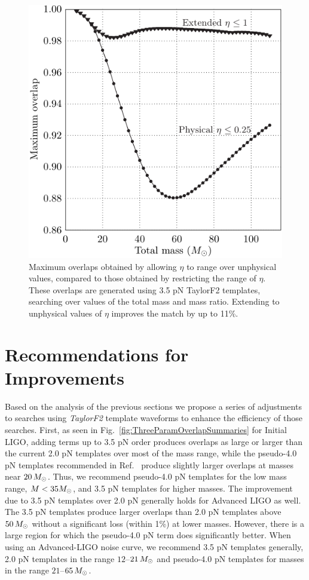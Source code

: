 \begin{figure}
  \begin{center}
    \includegraphics[width=0.55\linewidth]{figures/comparison/PhysicalAndUnphysicalEta}
  \end{center}
  \caption[Maximum overlaps obtained by allowing $\eta$ to range over unphysical values]{
  \label{fig:PhysicalEta}
    Maximum overlaps obtained by allowing $\eta$ to range over
    unphysical values, compared to those obtained by restricting the
    range of $\eta$.  These overlaps are generated using 3.5 pN
    TaylorF2 templates, searching over values of the total mass and
    mass ratio.  Extending to unphysical values of $\eta$ improves the
    match by up to 11\%.}
\end{figure}%


\section{Recommendations for Improvements}
\label{sec:Recommendations} %

Based on the analysis of the previous sections we propose a series of
adjustments to searches using \textit{TaylorF2} template waveforms to
enhance the efficiency of those searches.  First, as seen in
Fig.~\ref{fig:ThreeParamOverlapSummaries} for Initial LIGO, adding
terms up to 3.5 pN order produces overlaps as large or larger than the
current 2.0 pN templates over most of the mass range, while the
pseudo-4.0 pN templates recommended in Ref.~\cite{Pan2007} produce
slightly larger overlaps at masses near $20\,M_{\odot}$.  Thus, we
recommend pseudo-4.0 pN templates for the low mass range, $M < 35
M_{\odot}$, and 3.5 pN templates for higher masses.  The improvement due
to 3.5 pN templates over 2.0 pN generally holds for Advanced LIGO as
well.  The 3.5 pN templates produce larger overlaps than 2.0 pN
templates above $50\,M_{\odot}$ without a significant loss (within 1\%) at
lower masses.  However, there is a large region for which the
pseudo-4.0 pN term does significantly better.  When using an
Advanced-LIGO noise curve, we recommend 3.5 pN templates generally,
2.0 pN templates in the range $12$--$21\,M_{\odot}$ and pseudo-4.0 pN
templates for masses in the range $21$--$65\,M_{\odot}$.

